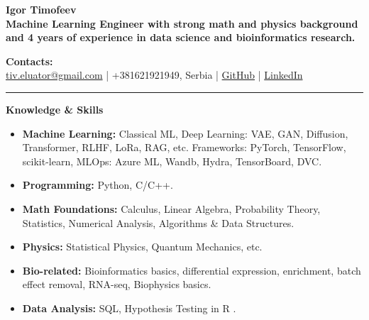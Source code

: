\documentclass[12pt]{article}
\begin{document}
\begin{center}
    {\Huge \textbf{Igor Timofeev}}\\[6pt]
    \textbf{Machine Learning Engineer with strong math and physics background and 4 years of experience in data science and bioinformatics research.}\\
\end{center}

\vspace{1em}

\noindent\textbf{Contacts:}\\
\href{mailto:tiv.eluator@gmail.com}{tiv.eluator@gmail.com} \quad | \quad
+381621921949, Serbia \quad | \quad
\href{https://github.com/eluator}{GitHub} \quad | \quad
\href{https://www.linkedin.com/in/itimofeev}{LinkedIn}

\vspace{1em}
\hrule
\vspace{1em}

\noindent \textbf{\Large Knowledge \& Skills}
\begin{itemize}
    \item \textbf{Machine Learning:} Classical ML, Deep Learning: VAE, GAN, Diffusion, Transformer, RLHF, LoRa, RAG, etc. Frameworks: PyTorch, TensorFlow, scikit-learn, MLOps: Azure ML, Wandb, Hydra, TensorBoard, DVC.
    \item \textbf{Programming:} Python, C/C++.
    \item \textbf{Math Foundations:} Calculus, Linear Algebra, Probability Theory, Statistics, Numerical Analysis, Algorithms \& Data Structures.
    \item \textbf{Physics:} Statistical Physics, Quantum Mechanics, etc.
    \item \textbf{Bio-related:} Bioinformatics basics, differential expression, enrichment, batch effect removal, RNA-seq, Biophysics basics.
    \item \textbf{Data Analysis:} SQL, Hypothesis Testing in R \href{https://github.com/eluator/DataAnalysisInR}{\faGithub}.
\end{itemize}

\vspace{1em}
\end{document}
